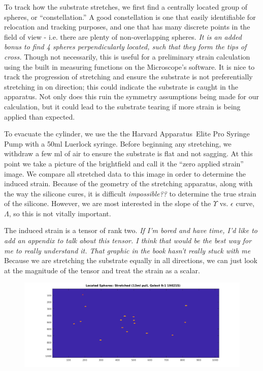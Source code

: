 To track how the substrate stretches, we first find a centrally located group of spheres, or ``constellation.'' A good constellation is one that easily identifiable for relocation and tracking purposes, and one that has many discrete points in the field of view - i.e. there are plenty of non-overlapping spheres. \emph{It is an added bonus to find 4 spheres perpendicularly located, such that they form the tips of cross.} Though not necessarily, this is useful for a preliminary strain calculation using the built in measuring functions on the Microscope's software. It is nice to track the progression of stretching and ensure the substrate is not preferentially stretching in on direction; this could indicate the substrate is caught in the apparatus. Not only does this ruin the symmetry assumptions being made for our calculation, but it could lead to the substrate tearing if more strain is being applied than expected.

To evacuate the cylinder, we use the the Harvard Apparatus\texttrademark \ Elite Pro Syringe Pump with a 50ml Luerlock syringe. Before beginning any stretching, we withdraw a few ml of air to ensure the substrate is flat and not sagging. At this point we take a picture of the brightfield and call it the ``zero applied strain'' image. We compare all stretched data to this image in order to determine the induced strain. Because of the geometry of the stretching apparatus, along with the way the silicone cures, it is difficult \emph{impossible??} to determine the true strain of the silicone. However, we are most interested in the slope of the $\Upsilon$ vs. $\epsilon$ curve, $\Lambda$, so this is not vitally important.

The induced strain is a tensor of rank two. \emph{If I'm bored and have time, I'd like to add an appendix to talk about this tensor. I think that would be the best way for me to really understand it. That graphic in the book hasn't really stuck with me} Because we are stretching the substrate equally in all directions, we can just look at the magnitude of the tensor and treat the strain as a scalar.     


\begin{figure}[h!]
	\centering
	\includegraphics[width=\linewidth]{Chapters/Figures/13ml_stretched_2D_located}
	\caption[Unstretched]{}
	\label{fig:13mlstretched2dlocated}
\end{figure}

